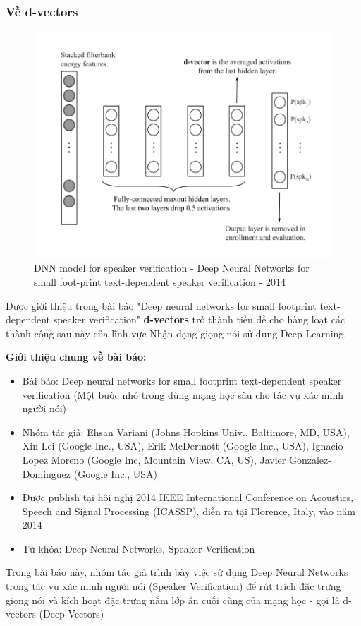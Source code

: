 \documentclass{article}
\begin{document}
	\subsubsection{Về d-vectors}
	\begin{figure}[H]
		\centering
		\includegraphics[width=0.75\linewidth]{images/d-vectors.png}
		\caption{DNN model for speaker verification - Deep Neural Networks for small foot-print text-dependent speaker verification - 2014}
		\label{fig:writing-thesis}
	\end{figure}
	\qquad Được giới thiệu trong bài báo "Deep neural networks for small footprint text-dependent speaker verification" \textbf{d-vectors} trở thành tiền đề cho hàng loạt các thành công sau này của lĩnh vực Nhận dạng giọng nói sử dụng Deep Learning.
	
	\textbf{Giới thiệu chung về bài báo:}
	\begin{itemize}
		\item Bài báo: Deep neural networks for small footprint text-dependent speaker verification (Một bước nhỏ trong dùng mạng học sâu cho tác vụ xác minh người nói)
		\item Nhóm tác giả: Ehsan Variani (Johns Hopkins Univ., Baltimore, MD, USA), Xin Lei (Google Inc., USA), Erik McDermott (Google Inc., USA), Ignacio Lopez Moreno (Google Inc, Mountain View, CA, US), Javier Gonzalez-Dominguez (Google Inc., USA)
		\item Được publish tại hội nghị 2014 IEEE International Conference on Acoustics, Speech and Signal Processing (ICASSP), diễn ra tại Florence, Italy, vào năm 2014
		\item Từ khóa: Deep Neural Networks, Speaker Verification
	\end{itemize}

	Trong bài báo này, nhóm tác giả trình bày việc sử dụng Deep Neural Networks trong tác vụ xác minh người nói (Speaker Verification) để rút trích đặc trưng giọng nói và kích hoạt đặc trưng nằm lớp ẩn cuối cùng của mạng học - gọi là d-vectors (Deep Vectors)
	
\end{document}
